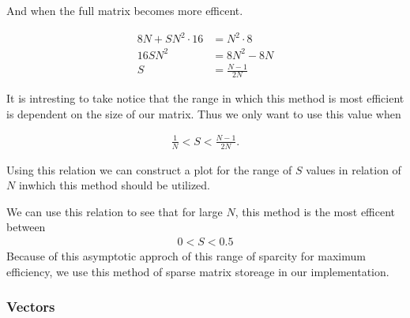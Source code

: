 \documentclass[../fem.tex]{subfiles}
\begin{document}
And when the full matrix becomes more efficent.

\begin{align*}
  8N+SN^2\cdot16&=N^2\cdot8\\
  16SN^2&=8N^2-8N\\
  S&=\frac{N-1}{2N}
\end{align*}

It is intresting to take notice that the range in which this method is most
efficient is dependent on the size of our matrix. Thus we only want to use this
value when

\begin{align*}
  \frac{1}{N}<S<\frac{N-1}{2N}.
\end{align*}

Using this relation we can construct a plot for the range of $S$ values in
relation of $N$ inwhich this method should be utilized.


We can use this relation to see that for large $N$, this method is the most
efficent between
\begin{align*}
  0 < S < 0.5
\end{align*}
Because of this asymptotic approch of this range of sparcity for maximum
efficiency, we use this method of sparse matrix storeage in our implementation.

\begin{Figure}
  \begin{center}
  \end{center}
  \label{fig:mat_CRS}
\end{Figure}

\subsubsection{Vectors}%
\label{ssub:vectors}
\end{document}
